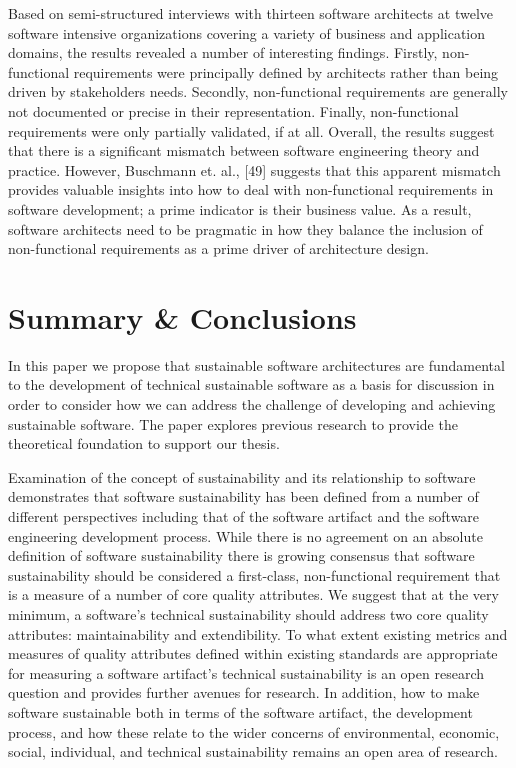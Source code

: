 \documentclass[preprint,12pt,authoryear]{elsarticle}
\begin{document}
Based on semi-structured interviews with thirteen software architects
at twelve software intensive organizations covering a variety of
business and application domains, the results revealed a number of
interesting findings. Firstly, non-functional requirements were
principally defined by architects rather than being driven by
stakeholders needs. Secondly, non-functional requirements are
generally not documented or precise in their representation. Finally,
non-functional requirements were only partially validated, if at
all. Overall, the results suggest that there is a significant mismatch
between software engineering theory and practice. However, Buschmann
et. al., [49] suggests that this apparent mismatch provides valuable
insights into how to deal with non-functional requirements in software
development; a prime indicator is their business value. As a result,
software architects need to be pragmatic in how they balance the
inclusion of non-functional requirements as a prime driver of
architecture design.


\section{Summary \& Conclusions}\label{sec:summconc}

In this paper we propose that sustainable software architectures are
fundamental to the development of technical sustainable software as a
basis for discussion in order to consider how we can address the
challenge of developing and achieving sustainable software. The paper
explores previous research to provide the theoretical foundation to
support our thesis.

Examination of the concept of sustainability and its relationship to
software demonstrates that software sustainability has been defined
from a number of different perspectives including that of the software
artifact and the software engineering development process. While there
is no agreement on an absolute definition of software sustainability
there is growing consensus that software sustainability should be
considered a first-class, non-functional requirement that is a measure
of a number of core quality attributes. We suggest that at the very
minimum, a software's technical sustainability should address two core
quality attributes: maintainability and extendibility. To what extent
existing metrics and measures of quality attributes defined within
existing standards are appropriate for measuring a software artifact’s
technical sustainability is an open research question and provides
further avenues for research. In addition, how to make software
sustainable both in terms of the software artifact, the development
process, and how these relate to the wider concerns of environmental,
economic, social, individual, and technical sustainability remains an
open area of research.
\end{document}
